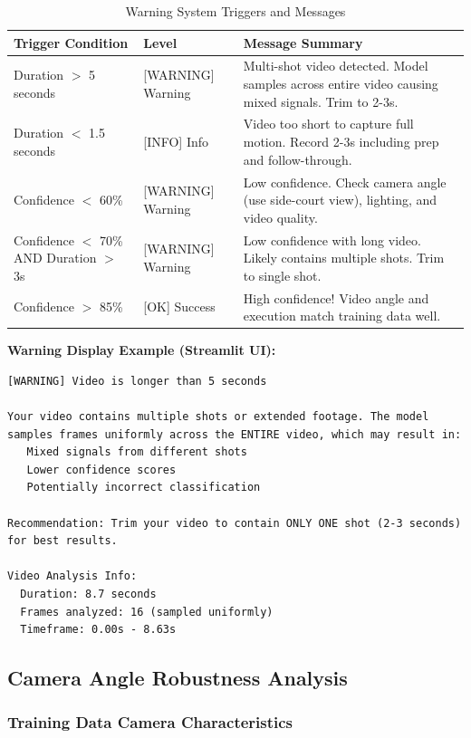 \documentclass[11pt,a4paper]{article}
\begin{document}
\begin{table}[H]
\centering
\caption{Warning System Triggers and Messages}
\small
\begin{tabular}{llp{5cm}}
\toprule
Trigger Condition & Level & Message Summary \\
\midrule
Duration $>$ 5 seconds & [WARNING] Warning & Multi-shot video detected. Model samples across entire video causing mixed signals. Trim to 2-3s. \\
Duration $<$ 1.5 seconds & [INFO] Info & Video too short to capture full motion. Record 2-3s including prep and follow-through. \\
Confidence $<$ 60\% & [WARNING] Warning & Low confidence. Check camera angle (use side-court view), lighting, and video quality. \\
Confidence $<$ 70\% AND Duration $>$ 3s & [WARNING] Warning & Low confidence with long video. Likely contains multiple shots. Trim to single shot. \\
Confidence $>$ 85\% & [OK] Success & High confidence! Video angle and execution match training data well. \\
\bottomrule
\end{tabular}
\end{table}

\textbf{Warning Display Example (Streamlit UI):}

\begin{verbatim}
[WARNING] Video is longer than 5 seconds

Your video contains multiple shots or extended footage. The model
samples frames uniformly across the ENTIRE video, which may result in:
   Mixed signals from different shots
   Lower confidence scores
   Potentially incorrect classification

Recommendation: Trim your video to contain ONLY ONE shot (2-3 seconds)
for best results.

Video Analysis Info:
  Duration: 8.7 seconds
  Frames analyzed: 16 (sampled uniformly)
  Timeframe: 0.00s - 8.63s
\end{verbatim}

\subsection{Camera Angle Robustness Analysis}

\subsubsection{Training Data Camera Characteristics}
\end{document}
